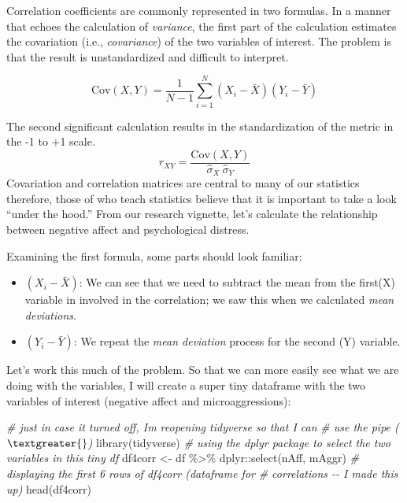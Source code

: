 \documentclass[
  11pt,
]{book}
\newenvironment{Shaded}{\begin{snugshade}}{\end{snugshade}}
\newcommand{\CommentTok}[1]{\textcolor[rgb]{0.56,0.35,0.01}{\textit{#1}}}
\newcommand{\FunctionTok}[1]{\textcolor[rgb]{0.00,0.00,0.00}{#1}}
\newcommand{\NormalTok}[1]{#1}
\newcommand{\OtherTok}[1]{\textcolor[rgb]{0.56,0.35,0.01}{#1}}
\newcommand{\SpecialCharTok}[1]{\textcolor[rgb]{0.00,0.00,0.00}{#1}}
\providecommand{\tightlist}{%
  \setlength{\itemsep}{0pt}\setlength{\parskip}{0pt}}
\begin{document}
Correlation coefficients are commonly represented in two formulas. In a manner that echoes the calculation of \emph{variance}, the first part of the calculation estimates the covariation (i.e., \emph{covariance}) of the two variables of interest. The problem is that the result is unstandardized and difficult to interpret.

\[
\mbox{Cov}(X,Y) = \frac{1}{N-1} \sum_{i=1}^N \left( X_i - \bar{X} \right) \left( Y_i - \bar{Y} \right)
\]

The second significant calculation results in the standardization of the metric in the -1 to +1 scale.
\[
r_{XY}  = \frac{\mbox{Cov}(X,Y)}{ \hat{\sigma}_X \ \hat{\sigma}_Y}
\]
Covariation and correlation matrices are central to many of our statistics therefore, those of who teach statistics believe that it is important to take a look ``under the hood.'' From our research vignette, let's calculate the relationship between negative affect and psychological distress.

Examining the first formula, some parts should look familiar:

\begin{itemize}
\tightlist
\item
  \((X_i - \bar{X})\): We can see that we need to subtract the mean from the first(X) variable in involved in the correlation; we saw this when we calculated \emph{mean deviations}.
\item
  \((Y_i - \bar{Y})\): We repeat the \emph{mean deviation} process for the second (Y) variable.
\end{itemize}

Let's work this much of the problem. So that we can more easily see what we are doing with the variables, I will create a super tiny dataframe with the two variables of interest (negative affect and microaggressions):

\begin{Shaded}
\begin{Highlighting}[]
\CommentTok{\# just in case it turned off, I\textquotesingle{}m reopening tidyverse so that I can}
\CommentTok{\# use the pipe ($\textgreater{}$)}
\FunctionTok{library}\NormalTok{(tidyverse)}
\CommentTok{\# using the dplyr package to select the two variables in this tiny df}
\NormalTok{df4corr }\OtherTok{\textless{}{-}}\NormalTok{ df }\SpecialCharTok{\%\textgreater{}\%}
\NormalTok{    dplyr}\SpecialCharTok{::}\FunctionTok{select}\NormalTok{(nAff, mAggr)}
\CommentTok{\# displaying the first 6 rows of df4corr (\textquotesingle{}dataframe for}
\CommentTok{\# correlations\textquotesingle{} {-}{-} I made this up)}
\FunctionTok{head}\NormalTok{(df4corr)}
\end{Highlighting}
\end{Shaded}
\end{document}

